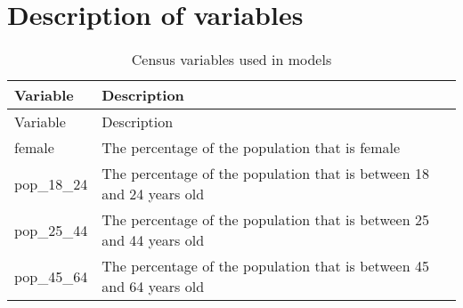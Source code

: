 \documentclass[12pt,twoside]{reedthesis}
\begin{document}
\hypertarget{appendix}{%
\chapter{Description of variables}\label{appendix}}
\begin{longtable}[]{@{}ll@{}}
\caption{\label{tab:var-list} Census variables used in models}\tabularnewline
\toprule
\begin{minipage}[b]{0.44\columnwidth}\raggedright
Variable\strut
\end{minipage} & \begin{minipage}[b]{0.50\columnwidth}\raggedright
Description\strut
\end{minipage}\tabularnewline
\midrule
\endfirsthead
\toprule
\begin{minipage}[b]{0.44\columnwidth}\raggedright
Variable\strut
\end{minipage} & \begin{minipage}[b]{0.50\columnwidth}\raggedright
Description\strut
\end{minipage}\tabularnewline
\midrule
\endhead
\begin{minipage}[t]{0.44\columnwidth}\raggedright
female\strut
\end{minipage} & \begin{minipage}[t]{0.50\columnwidth}\raggedright
The percentage of the population that is female\strut
\end{minipage}\tabularnewline
\begin{minipage}[t]{0.44\columnwidth}\raggedright
pop\_18\_24\strut
\end{minipage} & \begin{minipage}[t]{0.50\columnwidth}\raggedright
The percentage of the population that is between 18 and 24 years old\strut
\end{minipage}\tabularnewline
\begin{minipage}[t]{0.44\columnwidth}\raggedright
pop\_25\_44\strut
\end{minipage} & \begin{minipage}[t]{0.50\columnwidth}\raggedright
The percentage of the population that is between 25 and 44 years old\strut
\end{minipage}\tabularnewline
\begin{minipage}[t]{0.44\columnwidth}\raggedright
pop\_45\_64\strut
\end{minipage} & \begin{minipage}[t]{0.50\columnwidth}\raggedright
The percentage of the population that is between 45 and 64 years old\strut

\end{minipage}
\end{longtable}
\end{document}
